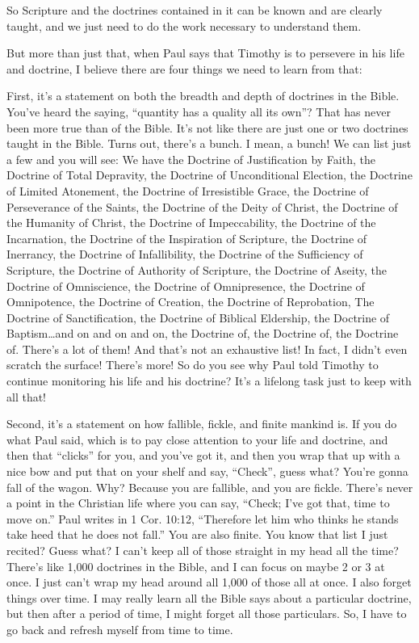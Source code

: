 \documentclass[letterpaper, 12pt]{article}
\begin{document}
    So Scripture and the doctrines contained in it can be known and are
    clearly taught, and we just need to do the work necessary to
    understand them.

    But more than just that, when Paul says that Timothy is to persevere
    in his life and doctrine, I believe there are four things we need to
    learn from that:

    First, it's a statement on both the breadth and depth of doctrines
    in the Bible. You've heard the saying, ``quantity has a quality all
    its own''? That has never been more true than of the Bible. It's not
    like there are just one or two doctrines taught in the Bible. Turns
    out, there's a bunch. I mean, a bunch! We can list just a few and
    you will see: We have the Doctrine of Justification by Faith, the
    Doctrine of Total Depravity, the Doctrine of Unconditional Election,
    the Doctrine of Limited Atonement, the Doctrine of Irresistible
    Grace, the Doctrine of Perseverance of the Saints, the Doctrine of
    the Deity of Christ, the Doctrine of the Humanity of Christ, the
    Doctrine of Impeccability, the Doctrine of the Incarnation, the
    Doctrine of the Inspiration of Scripture, the Doctrine of Inerrancy,
    the Doctrine of Infallibility, the Doctrine of the Sufficiency of
    Scripture, the Doctrine of Authority of Scripture, the Doctrine of
    Aseity, the Doctrine of Omniscience, the Doctrine of Omnipresence,
    the Doctrine of Omnipotence, the Doctrine of Creation, the Doctrine
    of Reprobation, The Doctrine of Sanctification, the Doctrine of
    Biblical Eldership, the Doctrine of Baptism\ldots and on and on and
    on, the Doctrine of, the Doctrine of, the Doctrine of. There's a lot
    of them! And that's not an exhaustive list! In fact, I didn't even
    scratch the surface! There's more! So do you see why Paul told
    Timothy to continue monitoring his life and his doctrine? It's a
    lifelong task just to keep with all that!

    Second, it's a statement on how fallible, fickle, and finite mankind
    is. If you do what Paul said, which is to pay close attention to
    your life and doctrine, and then that ``clicks'' for you, and you've
    got it, and then you wrap that up with a nice bow and put that on
    your shelf and say, ``Check'', guess what? You're gonna fall of the
    wagon. Why? Because you are fallible, and you are fickle.  There's
    never a point in the Christian life where you can say, ``Check; I've
    got that, time to move on.'' Paul writes in 1 Cor. 10:12,
    ``Therefore let him who thinks he stands take heed that he does not
    fall.'' You are also finite. You know that list I just recited?
    Guess what? I can't keep all of those straight in my head all the
    time? There's like 1,000 doctrines in the Bible, and I can focus on
    maybe 2 or 3 at once. I just can't wrap my head around all 1,000 of
    those all at once. I also forget things over time. I may really
    learn all the Bible says about a particular doctrine, but then after
    a period of time, I might forget all those particulars. So, I have
    to go back and refresh myself from time to time.
\end{document}
